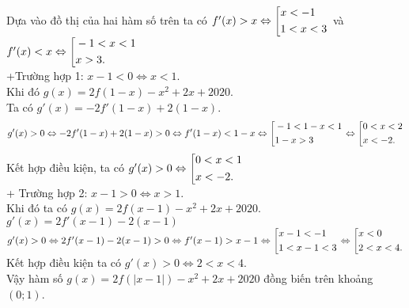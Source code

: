 \begin{ex}
{\begin{center}
		\end{center}
		Dựa vào đồ thị của hai hàm số trên ta có $f'(x)>x \Leftrightarrow\left[\begin{aligned}&x<-1 \\ &1<x<3\end{aligned}\right.$ và
		$ f'(x)<x \Leftrightarrow\left[\begin{aligned}&
			-1<x<1 \\
			&x>3.\end{aligned}\right.$\\
		+Trường hợp 1: $x-1<0 \Leftrightarrow x<1$.\\
		Khi đó $g(x)=2 f(1-x)-x^2+2 x+2020$.\\
		Ta có $g'(x)=-2 f'(1-x)+2(1-x)$.
		$$
		g'(x)>0 \Leftrightarrow-2 f'(1-x)+2(1-x)>0 \Leftrightarrow f'(1-x)<1-x \Leftrightarrow\left[\begin{aligned}
			&- 1 < 1 - x < 1\\
			&1 - x > 3\end{aligned}\right. \Leftrightarrow \left[\begin{aligned}&
			0<x<2 \\
			&x<-2.\end{aligned}\right.
		$$
		Kết hợp điều kiện, ta có $g'(x)>0 \Leftrightarrow\left[\begin{aligned}&0<x<1 \\ &x<-2.\end{aligned}\right.$\\
		
		+ Trường hợp 2: $x-1>0 \Leftrightarrow x>1$.\\
		Khi đó ta có $g(x)=2 f(x-1)-x^2+2 x+2020$.\\
		$ g'(x)=2 f'(x-1)-2(x-1)$\\
		$g'(x)>0 \Leftrightarrow 2 f'(x-1)-2(x-1)>0 \Leftrightarrow f'(x-1)>x-1 \Leftrightarrow\left[\begin{aligned}&
			x - 1 < - 1\\
			&1 < x - 1 < 3\end{aligned}\right.\Leftrightarrow \left[\begin{aligned}
			&x<0 \\
			&2<x<4.\end{aligned}\right.$
		Kết hợp điều kiện ta có $g'(x)>0 \Leftrightarrow 2<x<4$.\\
		Vậy hàm số $g(x)=2 f(|x-1|)-x^2+2 x+2020$ đồng biến trên khoảng $(0 ; 1)$.
	}
\end{ex}

